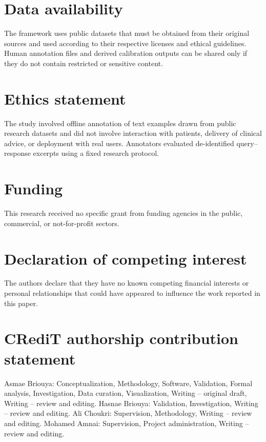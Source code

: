 \documentclass[preprint,12pt,a4paper]{elsarticle}
\begin{document}
\section*{Data availability}

The framework uses public datasets that must be obtained from their original sources and used according to their respective licenses and ethical guidelines. Human annotation files and derived calibration outputs can be shared only if they do not contain restricted or sensitive content.

\section*{Ethics statement}

The study involved offline annotation of text examples drawn from public research datasets and did not involve interaction with patients, delivery of clinical advice, or deployment with real users. Annotators evaluated de-identified query--response excerpts using a fixed research protocol. 
\section*{Funding}

This research received no specific grant from funding agencies in the public, commercial, or not-for-profit sectors.

\section*{Declaration of competing interest}

The authors declare that they have no known competing financial interests or personal relationships that could have appeared to influence the work reported in this paper.

\section*{CRediT authorship contribution statement}

Asmae Briouya: Conceptualization, Methodology, Software, Validation, Formal analysis, Investigation, Data curation, Visualization, Writing -- original draft, Writing -- review and editing. Hasnae Briouya: Validation, Investigation, Writing -- review and editing. Ali Choukri: Supervision, Methodology, Writing -- review and editing. Mohamed Amnai: Supervision, Project administration, Writing -- review and editing.
\end{document}
